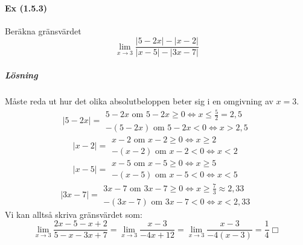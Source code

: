 \paragraph{Ex (1.5.3)} Beräkna gränsvärdet
\begin{equation*}
    \lim_{x\to 3}\frac{ |5-2x| - |x-2| }{ |x-5| - |3x-7| }
\end{equation*}
\subparagraph{Lösning} Måste reda ut hur det olika absolutbeloppen beter sig i en omgivning av $x=3$.
\begin{equation*}
    |5-2x|=
    \begin{matrix}
        5-2x\text{ om } 5-2x\geq 0 \Leftrightarrow x \leq \frac{5}{2}=2,5 \\
        -(5-2x)\text{ om } 5-2x < 0 \Leftrightarrow x > 2,5
    \end{matrix}
\end{equation*}
\begin{equation*}
    |x-2|=
    \begin{matrix}
        x-2\text{ om } x-2\geq 0 \Leftrightarrow x \geq 2 \\
        -(x-2)\text{ om } x-2 < 0 \Leftrightarrow x <2
    \end{matrix}
\end{equation*}
\begin{equation*}
    |x-5|=
    \begin{matrix}
        x-5\text{ om } x-5\geq 0 \Leftrightarrow x \geq 5 \\
        -(x-5)\text{ om } x-5 < 0 \Leftrightarrow x < 5
    \end{matrix}
\end{equation*}
\begin{equation*}
    |3x-7|=
    \begin{matrix}
        3x-7\text{ om } 3x-7 \geq 0 \Leftrightarrow x\geq \frac{7}{3}\approx 2,33 \\
        -(3x-7)\text{ om } 3x-7 < 0 \Leftrightarrow x < 2,33
    \end{matrix}
\end{equation*}
Vi kan alltså skriva gränsvärdet som:
\begin{equation*}
    \lim_{x\to 3}\frac{2x-5-x+2}{5-x-3x+7}=\lim_{x\to 3}\frac{x-3}{-4x+12}=\lim_{x\to 3}\frac{x-3}{-4(x-3)}=\frac{1}{4}\Box
\end{equation*}